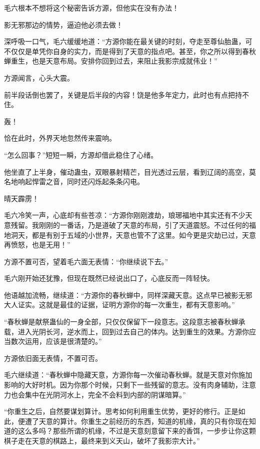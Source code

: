 
\begin{this_body}

毛六根本不想将这个秘密告诉方源，但他实在没有办法！

影无邪那边的情势，逼迫他必须去做！

深呼吸一口气，毛六缓缓地道：“方源你能在最关键的时刻，夺走至尊仙胎蛊，可不仅仅是单凭你自身的实力，而是得到了天意的指点吧。甚至，你之所以得到春秋蝉重生，也是天意布局。安排你回到过去，来阻止我影宗成就伟业！”

方源闻言，心头大震。

前半段话倒也罢了，关键是后半段的内容！饶是他多年定力，此时也有点把持不住。

轰！

恰在此时，外界天地忽然传来震响。

“怎么回事？”短短一瞬，方源却借此稳住了心绪。

他坐直了上半身，催动蛊虫，双眼暴射精芒，目光透过云层，看到辽阔的高空，莫名地响起悍雷之音，同时还闪烁起条条闪电。

晴天霹雳！

毛六冷笑一声，心底却有些苍凉：“方源你刚刚渡劫，琅琊福地中其实还有不少天意残留。我刚刚的一番话，乃是道破了天意的布局，引了天道震怒。不过任何的福地洞天，都是有别于五域的小世界，天意也管不了这里。如今更是灾劫已过，天意再愤怒，也是无用！”

方源不置可否，望着毛六面无表情：“你继续说下去。”

毛六刚开始还犹豫，但现在既然已经说出口了，心底反而一阵轻快。

他语越加流畅，继续道：“方源你的春秋蝉中，同样深藏天意。这点早已被影无邪大人证实。这就是最佳的证据，证明方源你的每一次重生，都有天意影响。”

“春秋蝉是献祭蛊仙的一身全部，只仅仅保留下一段意志。这段意志被春秋蝉承载，进入光阴长河，逆水而上，回到过去自己的体内。达到重生的效果。方源你应当数次运用，应该是很清楚的。”

方源依旧面无表情，不置可否。

毛六继续道：“春秋蝉中隐藏天意，方源你每一次催动春秋蝉。就是天意对你施加影响的大好时机。因为你那个时候，只剩下一些残留的意志。没有肉身辅助，注意力也会集中在光阴河水上，完全不会料到内部的阴谋暗算。”

“你重生之后，自然要谋划算计。思考如何利用重生优势，更好的修行。正是如此，便遭了天意的算计。你重生之前经历的东西，知道的机缘，真的只有你现在知道的这么多吗？那些所谓的机缘，不过是天意刻意留下来的香饵，一步步让你这颗棋子走在天意的棋路上，最终来到义天山，破坏了我影宗大计。”


\end{this_body}
